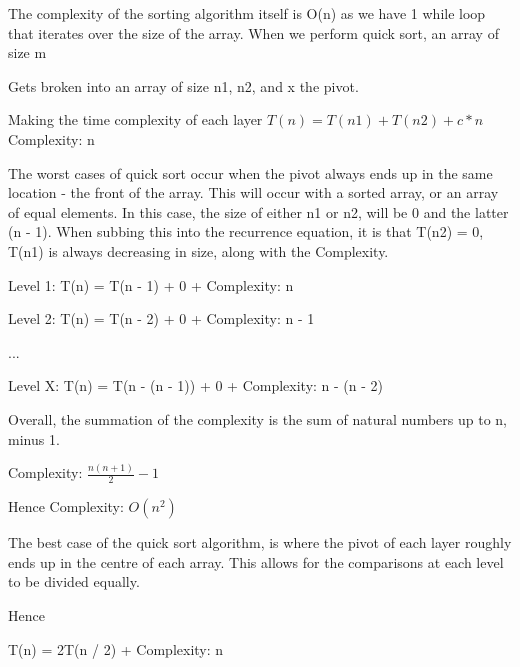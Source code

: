 \documentclass{article}
\begin{document}
The complexity of the sorting algorithm itself is O(n) as we have 1 while loop that iterates over the size of the array. When we perform quick sort, an array of size m \newline
\-\-\-\-\-\-\-\newline

Gets broken into an array of size n1, n2, and x the pivot.\newline

\-\-\- \- \-\-\-\newline

Making the time complexity of each layer $T(n) = T(n1) + T(n2) + c * n$\newline
 Complexity: n\newline


The worst cases of quick sort occur when the pivot always ends up in the same location - the front of the array. This will occur with a sorted array, or an array of equal elements. In this case, the size of either n1 or n2, will be 0 and the latter (n - 1). When subbing this into the recurrence equation, it is that T(n2) = 0, T(n1) is always decreasing in size, along with the Complexity.\par

Level 1: T(n) = T(n - 1) + 0 + Complexity: n\newline

Level 2: T(n) = T(n - 2) + 0 + Complexity: n - 1\newline

...\newline

Level X: T(n) = T(n - (n - 1)) + 0 + Complexity: n - (n - 2)\newline


Overall, the summation of the complexity is the sum of natural numbers up to n, minus 1.\newline

Complexity: $\frac{n(n + 1)}{2} - 1$\newline

Hence Complexity: $O(n^2)$\newline


The best case of the quick sort algorithm, is where the pivot of each layer roughly ends up in the centre of each array. This allows for the comparisons at each level to be divided equally.\par

Hence\newline


T(n) = 2T(n / 2) + Complexity: n\newline
\end{document}
